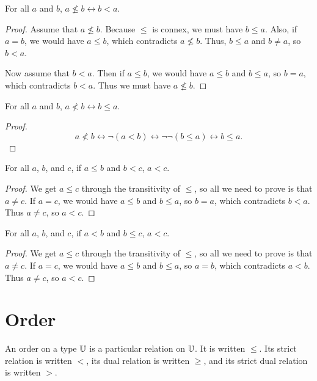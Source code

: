 \documentclass[../../math.tex]{subfiles}
\begin{document}
\begin{theorem}
    For all $a$ and $b$, $a \nleq b \leftrightarrow b < a$.
\end{theorem}
\begin{proof}
    Assume that $a \nleq b$.  Because $\leq$ is connex, we must have $b \leq a$.
    Also, if $a = b$, we would have $a \leq b$, which contradicts $a \nleq b$.
    Thus, $b \leq a$ and $b \neq a$, so $b < a$.

    Now assume that $b < a$.  Then if $a \leq b$, we would have $a \leq b$ and
    $b \leq a$, so $b = a$, which contradicts $b < a$.  Thus we must have $a
    \nleq b$.
\end{proof}

\begin{theorem}
    For all $a$ and $b$, $a \nless b \leftrightarrow b \leq a$.
\end{theorem}
\begin{proof}
    \[
        a \nless b \leftrightarrow \neg (a < b) \leftrightarrow \neg\neg (b \leq
        a) \leftrightarrow b \leq a.
    \]
\end{proof}

\begin{theorem}
    For all $a$, $b$, and $c$, if $a \leq b$ and $b < c$, $a < c$.
\end{theorem}
\begin{proof}
    We get $a \leq c$ through the transitivity of $\leq$, so all we need to
    prove is that $a \neq c$.  If $a = c$, we would have $a \leq b$ and $b \leq
    a$, so $b = a$, which contradicts $b < a$.  Thus $a \neq c$, so $a < c$.
\end{proof}

\begin{theorem}
    For all $a$, $b$, and $c$, if $a < b$ and $b \leq c$, $a < c$.
\end{theorem}
\begin{proof}
    We get $a \leq c$ through the transitivity of $\leq$, so all we need to
    prove is that $a \neq c$.  If $a = c$, we would have $a \leq b$ and $b \leq
    a$, so $a = b$, which contradicts $a < b$.  Thus $a \neq c$, so $a < c$.
\end{proof}

\section{Order}

\begin{class}
    An order on a type $\mathbb{U}$ is a particular relation on $\mathbb{U}$.  It is written
    $\leq$.  Its strict relation is written $<$, its dual relation is written
    $\geq$, and its strict dual relation is written $>$.
\end{class}
\end{document}
